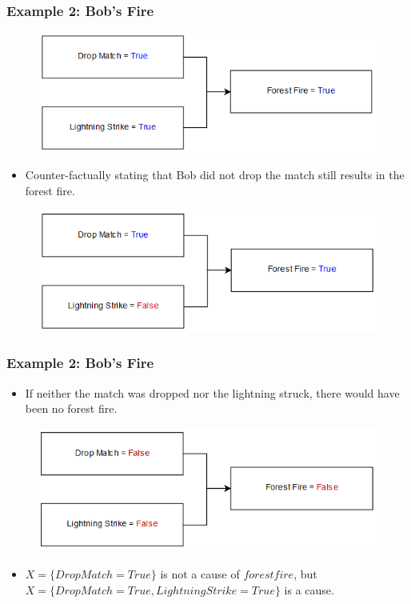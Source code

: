 \documentclass{beamer}
\theoremstyle{plain}
\theoremstyle{definition}
\begin{document}
\begin{frame}
\frametitle{Example 2: Bob's Fire}
\begin{figure}
\includegraphics[scale=.4]{bobModelReal}
\end{figure}

\begin{itemize}
\item Counter-factually stating that Bob did not drop the match still results in the forest fire.
\end{itemize}
\begin{figure}
\includegraphics[scale=.4]{bobModelCounterfactual}
\end{figure}

\end{frame}


\begin{frame}
\frametitle{Example 2: Bob's Fire}

\begin{itemize}
\item If neither the match was dropped nor the lightning struck, there would have been no forest fire.
\end{itemize}
\begin{figure}
\includegraphics[scale=.4]{bobModelCounterfactual2}
\end{figure}

\begin{itemize}
\item $X = \{Drop Match = True\}$ is not a cause of $forest fire$, but $X = \{Drop Match = True, Lightning Strike = True\}$ is a cause.
\end{itemize}

\end{frame}
\end{document}
